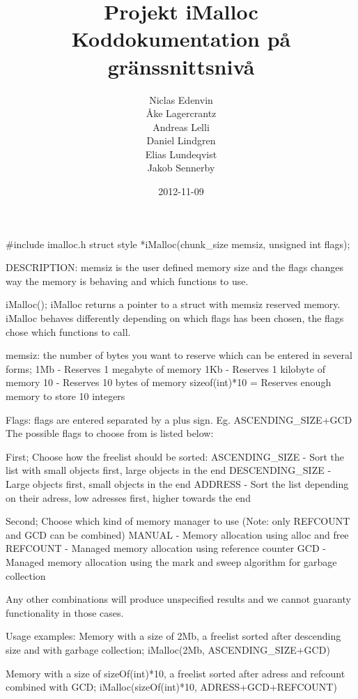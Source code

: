 \documentclass{article}
\title{
  Projekt iMalloc \\
  Koddokumentation på gränssnittsnivå
}
\author{
  Niclas Edenvin \\
  Åke Lagercrantz \\
  Andreas Lelli \\
  Daniel Lindgren \\
  Elias Lundeqvist \\
  Jakob Sennerby
}
\date{2012-11-09}
\begin{document}
\maketitle

\newpage






#include imalloc.h
struct style *iMalloc(chunk_size memsiz, unsigned int flags);

DESCRIPTION: memsiz is the user defined memory size and the flags changes
way the memory is behaving and which functions to use.


iMalloc();
  iMalloc returns a pointer to a struct with memsiz reserved memory. 
  iMalloc behaves differently depending on which flags has been chosen, 
  the flags chose which functions to call.

  memsiz: the number of bytes you want to reserve which can be entered in several forms;
  1Mb - Reserves 1 megabyte of memory
  1Kb - Reserves 1 kilobyte of memory
  10 - Reserves 10 bytes of memory
  sizeof(int)*10 = Reserves enough memory to store 10 integers

  Flags: flags are entered separated by a plus sign. Eg. ASCENDING_SIZE+GCD
  The possible flags to choose from is listed below:

  First; Choose how the freelist should be sorted:
  ASCENDING_SIZE - Sort the list with small objects first, large objects in the end
  DESCENDING_SIZE - Large objects first, small objects in the end
  ADDRESS - Sort the list depending on their adress, low adresses first, higher towards the end

  Second; Choose which kind of memory manager to use (Note: only REFCOUNT and GCD can be combined)
  MANUAL -  Memory allocation using alloc and free
  REFCOUNT - Managed memory allocation using reference counter
  GCD - Managed memory allocation using the mark and sweep algorithm for garbage collection

  Any other combinations will produce unspecified results and we cannot guaranty functionality
  in those cases.

  Usage examples:
  Memory with a size of 2Mb, a freelist sorted after descending size and with garbage collection;
  iMalloc(2Mb, ASCENDING_SIZE+GCD)

  Memory with a size of sizeOf(int)*10, a freelist sorted after adress and refcount combined with GCD;
  iMalloc(sizeOf(int)*10, ADRESS+GCD+REFCOUNT)
\end{document}
